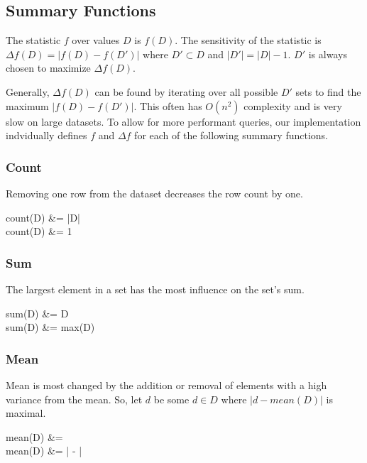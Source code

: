 \documentclass[conference,11pt]{IEEEtran}
\begin{document}
\subsection{Summary Functions}\label{sec:summary-functions}

The statistic $f$ over values $D$ is $f(D)$. The sensitivity of the statistic is
$\Delta f(D) = |f(D) - f(D')|$ where $D' \subset D$ and $|D'| = |D| - 1$. $D'$
is always chosen to maximize $\Delta f(D)$.

Generally, $\Delta f(D)$ can be found by iterating over all possible $D'$ sets
to find the maximum $|f(D) - f(D')|$. This often has $O(n^2)$ complexity and is
very slow on large datasets. To allow for more performant queries, our
implementation indvidually defines $f$ and $\Delta f$ for each of the following
summary functions.

\subsubsection{Count}

Removing one row from the dataset decreases the row count
by one.

\begin{equations}
    count(D) &= |D| \\
    \Delta count(D) &= 1
\end{equations}

\subsubsection{Sum}

The largest element in a set has the most influence on the
set's sum.

\begin{equations}
    sum(D) &= \sum D \\
    \Delta sum(D) &= max(D)
\end{equations}

\subsubsection{Mean}

Mean is most changed by the addition or removal of elements with a high variance
from the mean. So, let $d$ be some $d \in D$ where $|d - mean(D)|$ is maximal.

\begin{equations}
    mean(D) &=  \\
    \Delta mean(D) &= \left|  -  \right|
\end{equations}
\end{document}
